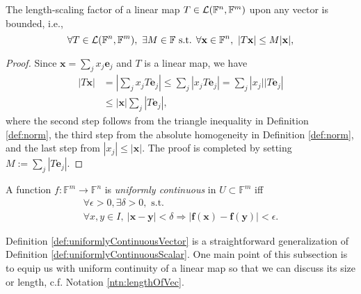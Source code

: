\begin{lem}
  \label{lem:linearOperatorBounded}
  The length-scaling factor of a linear map
  \mbox{$T\in {\cal L}(\mathbb{F}^n,\mathbb{F}^m)$}
  upon any vector is bounded, i.e., 
  \begin{equation}
    \label{eq:linearOperatorBounded}
    \forall T\in {\cal L}(\mathbb{F}^n,\mathbb{F}^m),\ 
    \exists M\in \mathbb{F} \text{ s.t. }
    \forall \mathbf{x}\in \mathbb{F}^n,\
    |T\mathbf{x}|\le M|\mathbf{x}|,
  \end{equation}
\end{lem}
\begin{proof}
  Since $\mathbf{x}=\sum_j x_j\mathbf{e}_j$
  and $T$ is a linear map, we have
  \begin{displaymath}
    \begin{array}{rl}
    |T\mathbf{x}| &= \left|\sum_j x_j T \mathbf{e}_j\right|
                    \le \sum_j \left| x_j T \mathbf{e}_j\right|
                    = \sum_j \left| x_j||T \mathbf{e}_j\right|
    \\
    &\le  |\mathbf{x}| \sum_j\left|T \mathbf{e}_j\right|, 
    \end{array}
  \end{displaymath}
  where the second step follows from the triangle inequality
  in Definition \ref{def:norm}, 
  the third step from the absolute homogeneity 
  in Definition \ref{def:norm}, 
  and the last step from $|x_j|\le |\mathbf{x}|$.
  The proof is completed by setting
  $M:=\sum_j\left|T \mathbf{e}_j\right|$.
\end{proof}

\begin{defn}
  \label{def:uniformlyContinuousVector}
  A function $f: \mathbb{F}^m\rightarrow \mathbb{F}^n$
  is \emph{uniformly continuous} in $U\subset \mathbb{F}^m$
  iff
   \begin{equation}
     \label{eq:uniformlyContinuous}
     \begin{array}{l}
     \forall \epsilon>0, \exists \delta>0,\text{ s.t. }
     \\
     \forall x,y\in I,\ 
       |\mathbf{x}-\mathbf{y}|<\delta \Rightarrow
       |\mathbf{f}(\mathbf{x})-\mathbf{f}(\mathbf{y})|<\epsilon.
     \end{array}
   \end{equation}
\end{defn}

\begin{rem}
  Definition \ref{def:uniformlyContinuousVector}
  is a straightforward generalization
  of Definition \ref{def:uniformlyContinuousScalar}.
  One main point of this subsection is to
  equip us with uniform continuity of a linear map
  so that we can discuss its size or length, c.f. Notation \ref{ntn:lengthOfVec}.
\end{rem}

